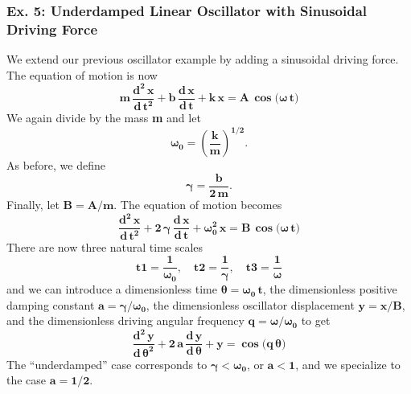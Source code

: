 \documentclass[11pt]{article}
\begin{document}
\subsubsection{Ex. 5: Underdamped Linear Oscillator with Sinusoidal Driving Force}
We extend our previous oscillator example by adding a sinusoidal driving force.
The equation of motion is now
\begin{equation}
\mathbf{m\,\frac{d^{2}\,x}{d\,t^{2}} + b\,\frac{d\,x}{d\,t} + k \,x = A\,\boldsymbol{\cos(\omega}\,t)}
\end{equation}
We again divide by the mass \textbf{m} and let
\begin{equation}
\mathbf{\boldsymbol{\omega}_{0} = \left(\frac{k}{m}\right)^{1/2}.}
\end{equation}
As before, we define
\begin{equation}
\mathbf{\boldsymbol{\gamma} = \frac{b}{2\,m}. }
\end{equation}
Finally, let $\mathbf{B = A/m}$.
The equation of motion becomes
\begin{equation}
\mathbf{\frac{d^{2}\,x}{d\,t^{2}} + 2\,\boldsymbol{\gamma}\,\frac{d\,x}{d\,t} +
   \boldsymbol{\omega}_{0}^{2} \,x = B\,\boldsymbol{\cos(\omega}\,t)}
\end{equation}
There are now three natural time scales
\begin{equation}
\mathbf{ t1 = \frac{1}{\boldsymbol{\omega}_{0}}, \quad  t2 = \frac{1}{\boldsymbol{\gamma}},
  \quad t3 = \frac{1}{\boldsymbol{\omega}} }
\end{equation}
  and we can introduce a dimensionless time $\mathbf{\boldsymbol{\theta} = \boldsymbol{\omega}_{0}\,t}$,
  the dimensionless positive damping constant $\mathbf{a = \boldsymbol{\gamma/\omega_{0}}}$,
   the dimensionless oscillator displacement $\mathbf{y = x/B}$, and the dimensionless
   driving angular frequency $\mathbf{q = \boldsymbol{\omega}/\boldsymbol{\omega}_{0}}$   to get
\begin{equation}
\mathbf{\frac{d^{2}\,y}{d\,\boldsymbol{\theta}^{2}} +
   2\,a\,\frac{d\,y}{d\,\boldsymbol{\theta}} + y = \boldsymbol{\cos(q\,\theta})}
\end{equation}
The ``underdamped'' case corresponds to $\mathbf{\boldsymbol{\gamma} < \boldsymbol{\omega}_{0}}$,
  or $\mathbf{a < 1}$, and we specialize to the case $\mathbf{a = 1/2}$.
\end{document}

